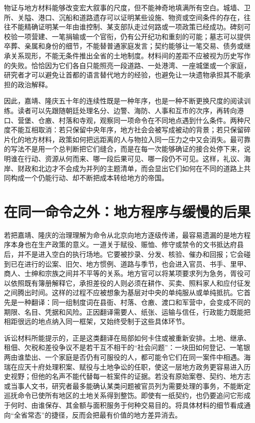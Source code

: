 物证与地方材料能够改变宏大叙事的尺度，但不能神奇地填满所有空白。城墙、卫所、关隘、港口、沉船和道路遗存可以证明某些设施、物资或空间条件的存在，往往不能精确证明某一年由谁控制、某支部队走过何路或一项政策已经成功。碑刻可校验一项营建、一笔捐输或一个官衔，仍有公开纪功和重刻的可能；墓志可以提供卒葬、亲属和身份的细节，不能替普通家庭发言；契约能够让一笔交易、债务或继承关系现形，不能无条件推出全省的土地制度。材料间的差距不应被视为历史写作的失败。恰恰因为它们各自只能照亮一段道路、一处港湾、一座城堡或一个家庭，研究者才可以避免让首都的语言替代地方的经验，也避免让一块遗物承担其不能承担的政治解释。

因此，嘉靖、隆庆五十年的连续性既是一种年序，也是一种不断更换尺度的阅读训练。读者可以先跟随朝廷处理名分、边警、海防、人事和互市的次序，再转向港口、营堡、仓廒、村落和寺观，观察同一项命令在不同地点遇到什么条件。两种尺度不能互相取消：若只保留中央年序，地方社会会被写成被动的背景；若只保留碎片化的地方材料，政策如何把远距离的人与物拉入同一压力之中又会消失。最可靠的写法不是用一个总判断把它们缝合，而是在每一次能够确证的接合处停下来，说明谁在行动、资源从何而来、哪一段后果可见、哪一段仍不可见。这样，礼议、海岸、财政和北边才不会成为并列的主题清单，而会显出它们如何在不同的道路上共同构成一个仍能行动、却不断把成本转给地方的帝国。

\section{在同一命令之外：地方程序与缓慢的后果}

若把嘉靖、隆庆的治理理解为命令从北京向地方逐级传递，最容易遗漏的是地方程序本身也在生产政策的意义。一道关于赋役、赈恤、修守或禁令的文书抵达府县后，并不是进入空白的执行场地。它要被抄录、分发、核验、催办和回报；它会碰到已在进行的讼案、旧欠、地方惯例、道路与季节，也会进入官员、书手、里甲、商人、士绅和宗族之间并不平等的关系。地方官可以将某项要求列为急务，胥役可以依照既有簿册解释它，承担差役的人则必须在耕作、买卖、照料家人和应付征发之间腾出时间。这样的过程不应被想象为基层对中央的单纯服从或单纯抵抗。它首先是一种翻译：同一组制度词在县衙、村落、仓廒、渡口和军营中，会变成不同的期限、名目、凭据和风险。正因翻译需要人、纸张、运输与信任，行政能力既能把相距很远的地点纳入同一框架，又始终受制于这些具体环节。

诉讼材料所能提示的，正是这类翻译在局部如何卡住或被重新安排。土地、继承、租佃、欠税和差役争议不是若干互不相干的“社会问题”：一块田如何登记、一笔银两由谁垫出、一个家庭是否仍有可服役的人，都可能令它们在同一案件中相遇。海瑞在应天十府处理积案、赋役与土地争讼的任职，使这一层地方政务更容易进入历史视野；但他的名声不能代替每一桩案件的证据。若没有原始案卷、契约、地方志或当事人文书，研究者最多能确认某类问题被官员列为需要处理的事务，不能断定巡抚命令已使所有地区的土地关系得到整饬。即使有一纸契约，也仍要追问它形成于何时、由谁保存、其金额与面积服务于何种交易目的。将具体材料的细节看成通向“全省常态”的捷径，反而会把最有价值的地方差异消去。

